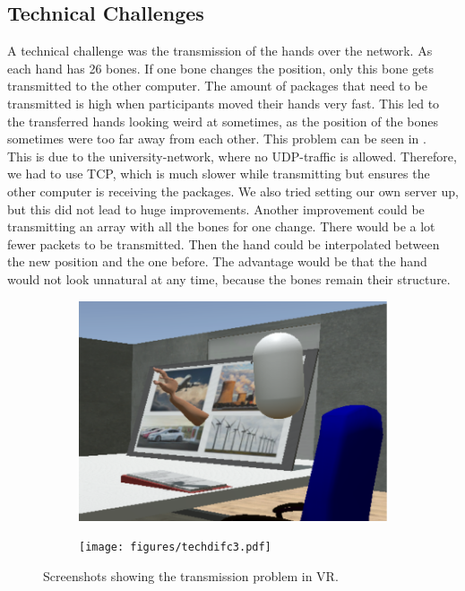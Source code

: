 \documentclass[english,runningheads,a4paper]{llncs}[2018/03/10]
\begin{document}
\subsection{Technical Challenges}
\label{sec:techdifc}
A technical challenge was the transmission of the hands over the network. 
As each hand has 26 bones. If one bone changes the position, only this bone gets transmitted to the other computer. The amount of packages that need to be transmitted is high when participants moved their hands very fast. This led to the transferred hands looking weird at sometimes, as the position of the bones sometimes were too far away from each other.
This problem can be seen in . \\ \linebreak
This is due to the university-network, where no UDP-traffic is allowed. Therefore, we had to use TCP, which is much slower while transmitting but ensures the other computer is receiving the packages. We also tried setting our own server up, but this did not lead to huge improvements. Another improvement could be transmitting an array with all the bones for one change. There would be a lot fewer packets to be transmitted. Then the hand could be interpolated between the new position and the one before. The advantage would be that the hand would not look unnatural at any time, because the bones remain their structure.
\begin{figure}[t]
    \centering
    \begin{subfigure}{.49\textwidth}
        \includegraphics[width=\textwidth]{figures/techdifc.pdf}
    \end{subfigure} \hfill
     \begin{subfigure}{.49\textwidth}
        \texttt{[image: figures/techdifc3.pdf]}
    \end{subfigure}
    \caption{Screenshots showing the transmission problem in VR.}
    \label{fig:techdifc}
\end{figure}
\end{document}
